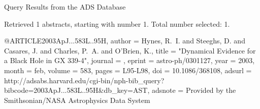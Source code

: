 Query Results from the ADS Database


Retrieved 1 abstracts, starting with number 1.  Total number selected: 1.

@ARTICLE{2003ApJ...583L..95H,
   author = {{Hynes}, R.~I. and {Steeghs}, D. and {Casares}, J. and {Charles}, P.~A. and 
	{O'Brien}, K.},
    title = "{Dynamical Evidence for a Black Hole in GX 339-4}",
  journal = {\apjl},
   eprint = {astro-ph/0301127},
     year = 2003,
    month = feb,
   volume = 583,
    pages = {L95-L98},
      doi = {10.1086/368108},
   adsurl = {http://adsabs.harvard.edu/cgi-bin/nph-bib_query?bibcode=2003ApJ...583L..95H&db_key=AST},
  adsnote = {Provided by the Smithsonian/NASA Astrophysics Data System}
}


